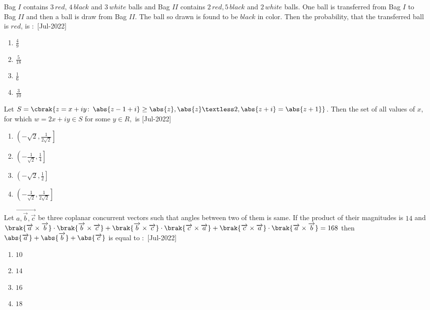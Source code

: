  \iffalse
    \title{2022}
    \author{EE24BTECH11021}
    \section{mcq-single}
\fi
    \item Bag $I$ contains $3\, red,\,4\,black$ and $3\,white$ balls and Bag $II$ contains $2\,red,5\,black$ and $2\,white$ balls. One ball is transferred from Bag $I$ to Bag $II$ and then a ball is draw from Bag $II$. The ball so drawn is found to be $black$ in color. Then the probability, that the transferred ball is $red$, is $\colon$  
    \hfill{[Jul-2022]}
        \begin{enumerate}
            \item $\frac{4}{9}$
            \item $\frac{5}{18}$
            \item $\frac{1}{6}$
            \item $\frac{3}{10}$
        \end{enumerate}
    \item Let $S=\cbrak{z=x+ iy\colon\,\abs{z-1+i}\geq \abs{z},\abs{z}\textless 2,\abs{z+i}=\abs{z+1}}$. Then the set of all values of $x$, for which $w=2x+iy\in S$ for some $y\in R,$ is
    \hfill{[Jul-2022]}
        \begin{enumerate}
            \item $\left(-\sqrt{2},\frac{1}{2\sqrt{2}} \right]$
            \item $\left(-\frac{1}{\sqrt{2}},\frac{1}{4} \right]$
            \item $\left(-\sqrt{2},\frac{1}{2} \right]$
            \item $\left(-\frac{1}{\sqrt{2}},\frac{1}{2\sqrt{2}} \right]$
        \end{enumerate}
    \item Let $\overrightarrow{a,\overrightarrow{b},\overrightarrow{c}}$ be three coplanar concurrent vectors such that angles between two of them is same. If the product of their magnitudes is $14$ and $\brak{\overrightarrow{a}\times\overrightarrow{b}}\cdot\brak{\overrightarrow{b}\times\overrightarrow{c}}+\brak{\overrightarrow{b}\times\overrightarrow{c}}\cdot\brak{\overrightarrow{c}\times\overrightarrow{a}}+\brak{\overrightarrow{c}\times\overrightarrow{a}}\cdot\brak{\overrightarrow{a}\times\overrightarrow{b}}=168$ then $\abs{\overrightarrow{a}}+\abs{\overrightarrow{b}}+\abs{\overrightarrow{c}}$ is equal to $\colon$  \hfill{[Jul-2022]}
        \begin{enumerate}
            \item $10$
            \item $14$
            \item $16$
            \item $18$
        \end{enumerate}
